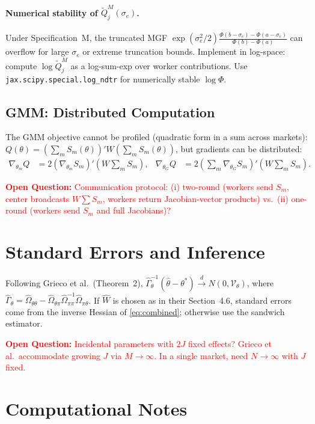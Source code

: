 \documentclass[11pt]{article}
\newcommand{\openq}[1]{\medskip\noindent\textcolor{red}{\textbf{Open Question:} #1}\medskip}
\begin{document}
\paragraph{Numerical stability of $\tilde Q_j^M(\sigma_e)$.} Under Specification~M, the truncated MGF $\exp(\sigma_e^2/2)\frac{\Phi(b-\sigma_e)-\Phi(a-\sigma_e)}{\Phi(b)-\Phi(a)}$ can overflow for large $\sigma_e$ or extreme truncation bounds. Implement in log-space: compute $\log\tilde Q_j^M$ as a log-sum-exp over worker contributions. Use \texttt{jax.scipy.special.log\_ndtr} for numerically stable $\log\Phi$.

\subsection{GMM: Distributed Computation}

The GMM objective cannot be profiled (quadratic form in a sum across markets):
$Q(\theta) = (\sum_m S_m(\theta))' W (\sum_m S_m(\theta))$,
but gradients can be distributed:
\begin{align*}
\nabla_{\theta_m}Q &= 2(\nabla_{\theta_m}S_m)'\!(W\textstyle\sum_m S_m), &
\nabla_{\theta_G}Q &= 2(\textstyle\sum_m\nabla_{\theta_G}S_m)'\!(W\textstyle\sum_m S_m).
\end{align*}

\openq{Communication protocol: (i) two-round (workers send $S_m$, center broadcasts $W\sum S_m$, workers return Jacobian-vector products) vs.\ (ii) one-round (workers send $S_m$ and full Jacobians)?}


\section{Standard Errors and Inference}

Following Grieco et al.\ (Theorem~2), $\hat\Gamma_\theta^{-1}(\hat\theta-\theta^*) \xrightarrow{d} N(0,\mathcal V_\theta)$,
where $\hat\Gamma_\theta = \hat\Omega_{\theta\theta} - \hat\Omega_{\theta\pi}\hat\Omega_{\pi\pi}^{-1}\hat\Omega_{\pi\theta}$. If $\hat W$ is chosen as in their Section~4.6, standard errors come from the inverse Hessian of \eqref{eq:combined}; otherwise use the sandwich estimator.

\openq{Incidental parameters with $2J$ fixed effects? Grieco et al.\ accommodate growing $J$ via $M\to\infty$. In a single market, need $N\to\infty$ with $J$ fixed.}


\section{Computational Notes}
\end{document}
